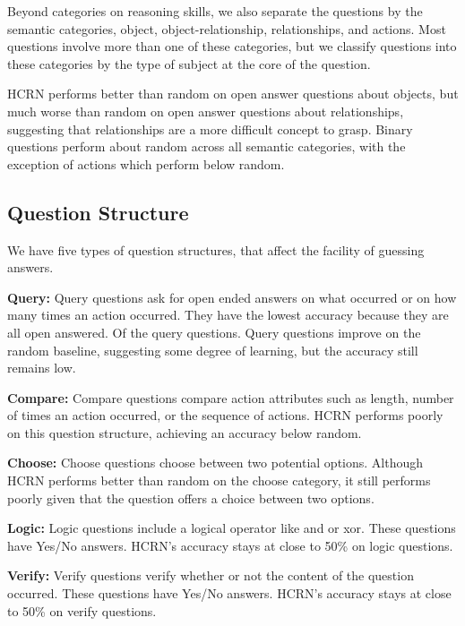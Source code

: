 \documentclass[10pt,twocolumn,letterpaper]{article}
\begin{document}
Beyond categories on reasoning skills, we also separate the questions by the semantic categories, object, object-relationship, relationships, and actions. Most questions involve more than one of these categories, but we classify questions into these categories by the type of subject at the core of the question. 

HCRN performs better than random on open answer questions about objects, but much worse than random on open answer questions about relationships, suggesting that relationships are a more difficult concept to grasp. Binary questions perform about random across all semantic categories, with the exception of actions which perform below random.


\subsection{Question Structure}

We have five types of question structures, that affect the facility of guessing answers. 

\textbf{Query: } Query questions ask for open ended answers on what occurred or on how many times an action occurred. They have the lowest accuracy because they are all open answered. Of the query questions. Query questions improve on the random baseline, suggesting some degree of learning, but the accuracy still remains low.

\textbf{Compare: } Compare questions compare action attributes such as length, number of times an action occurred, or the sequence of actions. HCRN performs poorly on this question structure, achieving an accuracy below random.

\textbf{Choose: } Choose questions choose between two potential options. Although HCRN performs better than random on the choose category, it still performs poorly given that the question offers a choice between two options.

\textbf{Logic: } Logic questions include a logical operator like and or xor. These questions have Yes/No answers. HCRN's accuracy stays at close to  50\% on logic questions.

\textbf{Verify: } Verify questions verify whether or not the content of the question occurred. These questions have Yes/No answers. HCRN's accuracy stays at close to 50\% on verify questions.
\end{document}
